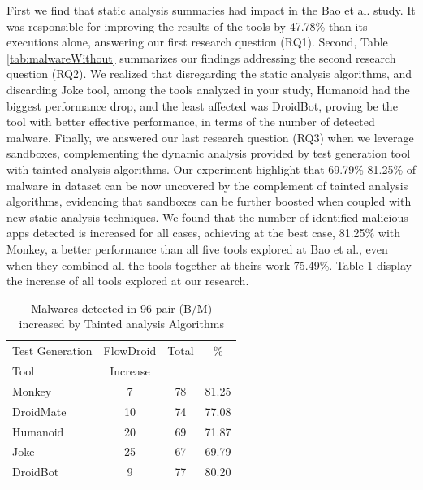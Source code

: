 First we find that static analysis summaries had impact in the Bao et al. study. It was responsible for improving the results of the tools by 47.78\% than its executions alone, answering our first research question (RQ1). Second, Table \ref{tab:malwareWithout} summarizes our findings addressing the second research question (RQ2). We realized that disregarding the static analysis algorithms, and discarding Joke tool, among the tools analyzed in your study, Humanoid had the biggest performance drop, and the least affected was DroidBot, proving be the tool with better effective performance, in terms of the number of detected malware. Finally, we answered our last research question (RQ3) when we leverage sandboxes, complementing the dynamic analysis provided by test generation tool with tainted analysis algorithms. Our experiment highlight that 69.79\%-81.25\% of malware in dataset can be now uncovered by the complement of tainted analysis algorithms, evidencing that 
sandboxes can be further boosted when coupled with new static analysis techniques. We found that the number of identified malicious apps detected is increased for all cases, achieving at the best case, 81.25\% with Monkey, a better performance than all five tools explored at Bao et al., even when they combined all the tools together at theirs work 75.49\%. Table \ref{tab:tanted} display the increase of all tools explored at our research.

\begin{table}[ht]
\centering
\begin{tabular}{lccc}\toprule
 Test Generation & FlowDroid & Total & \%\\
 Tool & Increase  &  & \\ \midrule
 Monkey & 7 & 78 & 81.25\\
 DroidMate & 10 &  74 & 77.08 \\
 Humanoid & 20 & 69 & 71.87  \\
 Joke & 25 & 67 & 69.79 \\
 DroidBot & 9 & 77 & 80.20  \\\midrule
 
\end{tabular} 
\caption{Malwares detected in 96 pair (B/M) increased by Tainted analysis Algorithms}
\label{tab:tanted}
\end{table}





